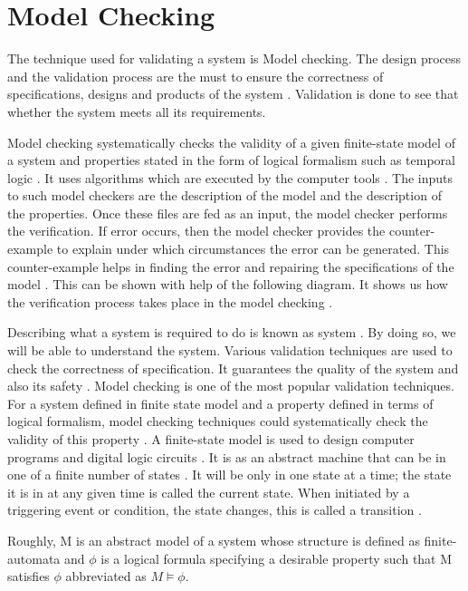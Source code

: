 \documentclass[a4paper,10pt]{report}
\begin{document}
\chapter{Model Checking}
\label{Model check}

The technique used for validating a system is Model checking. The design process and the validation process are the must to ensure the correctness of specifications, designs and products of the system \cite{ErichGamma1995}. Validation is done to see that whether the system meets all its requirements. 

Model checking systematically checks the validity of a given finite-state model of a system and properties stated in the form of logical formalism such as temporal logic \cite{Palshikar2004}. It uses algorithms which are executed by the computer tools \cite{McMillan2003}. The inputs to such model checkers are the description of the model and the description of the properties. Once these files are fed as an input, the model checker performs the verification. If error occurs, then the model checker provides the counter-example to explain under which circumstances the error can be generated. This counter-example helps in finding the error and repairing the specifications of the model \cite{Wang2007}. This can be shown with help of the following diagram. It shows us how the verification process takes place in the model checking \cite{DanielJackson}.  

Describing what a system is required to do is known as system \cite{Wang2007}. By doing so, we will be able to understand the system. Various validation techniques are used to check the correctness of specification. It guarantees the quality of the system and also its safety \cite{Clarke1999}. Model checking is one of the most popular validation techniques. For a system defined in finite state model and a property defined in terms of logical formalism, model checking techniques could systematically check the validity of this property \cite{Engler}. A finite-state model is used to design computer programs and digital logic circuits \cite{ErichGamma1995}. It is as an abstract machine that can be in one of a finite number of states \cite{M.Davis1962}. It will be only in one state at a time; the state it is in at any given time is called the current state. When initiated by a triggering event or condition, the state changes, this is called a transition \cite{D.Jackson}.

Roughly, M is an abstract model of a system whose structure is defined as finite-automata and $\phi$  is a logical formula specifying a desirable property such that M satisfies $\phi$  abbreviated as $M \models \phi$. 
\end{document}
